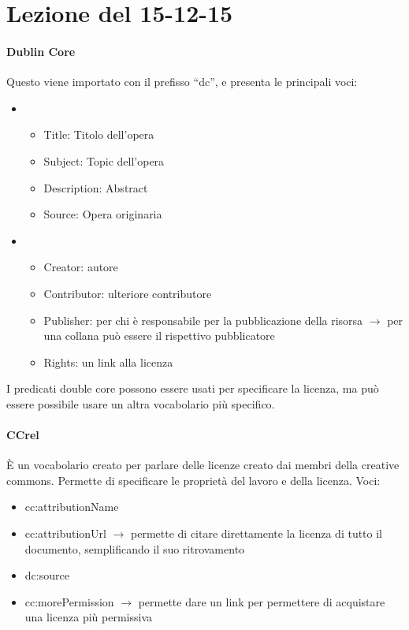 \section{Lezione del 15-12-15}
\graphicspath{ {res/data/15-12-15/} }


\paragraph*{Dublin Core}Questo viene importato con il prefisso ``dc'', e presenta le principali voci:
\begin{itemize}
\item[Contenuto]
  \begin{itemize}
    
  \item Title: Titolo dell'opera
  \item Subject: Topic dell'opera
  \item Description: Abstract
  \item Source: Opera originaria
    
  \end{itemize}

\item[Propriet\`a Intellettuale]
  \begin{itemize}

  \item Creator: autore
  \item Contributor: ulteriore contributore
  \item Publisher: per chi \`e responsabile per la pubblicazione della risorsa $\to$ per una collana pu\`o essere il rispettivo pubblicatore
    \item Rights: un link alla licenza
    
  \end{itemize}
  
\end{itemize}

I predicati double core possono essere usati per specificare la licenza, ma pu\`o essere possibile usare un altra vocabolario pi\`u specifico.

\paragraph*{CCrel} \`E un vocabolario creato per parlare delle licenze creato dai membri della creative commons. Permette di specificare le propriet\`a del lavoro e della licenza.
Voci:
\begin{itemize}

\item cc:attributionName
\item cc:attributionUrl $\to$ permette di citare direttamente la licenza di tutto il documento, semplificando il suo ritrovamento
\item dc:source
\item cc:morePermission $\to$ permette dare un link per permettere di acquistare una licenza pi\`u permissiva
  
\end{itemize}

